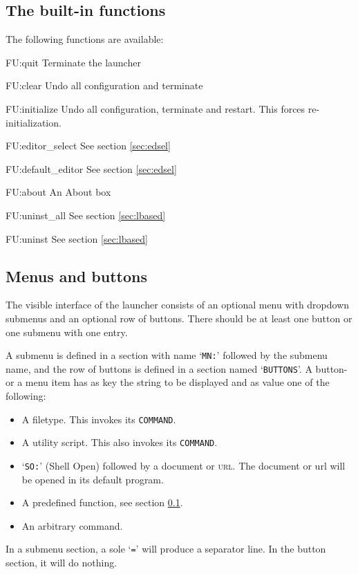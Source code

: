 \documentclass[11pt,a4paper,oneside]{report}
\newenvironment{ttdesc}{%
  \def\descriptionlabel##1{\hspace\labelsep\ttfamily\selectfont ##1}%
  \description}{\enddescription}
\begin{document}
\subsection{The built-in functions}
\label{sec:fun}

The following functions are available:
\begin{ttdesc}
\item [FU:quit] Terminate the launcher
\item [FU:clear] Undo all configuration and terminate
\item [FU:initialize] Undo all configuration, terminate and
  restart. This forces re-initialization.
\item [FU:editor\_select] See section \ref{sec:edsel}
\item [FU:default\_editor] See section \ref{sec:edsel}
\item [FU:about] An About box
\item [FU:uninst\_all] See section \ref{sec:lbased}
\item [FU:uninst] See section \ref{sec:lbased}
\end{ttdesc}

\subsection{Menus and buttons}
\label{sec:controls}

The visible interface of the launcher consists of an optional menu
with dropdown submenus and an optional row of buttons. There should be
at least one button or one submenu with one entry.

A submenu is defined in a section with name `\texttt{MN:}' followed
by the submenu name, and the row of buttons is defined in a section
named `\texttt{BUTTONS}'. A button- or a menu item has as key the
string to be displayed and as value one of the following:
\begin{itemize}
\item A filetype. This invokes its \texttt{COMMAND}.
\item A utility script. This also invokes its \texttt{COMMAND}.
\item `\texttt{SO:}' (Shell Open) followed by a document or
  \textsc{url}. The document or url will be opened in its default
  program.
\item A predefined function, see section \ref{sec:fun}.
\item An arbitrary command.
\end{itemize}
In a submenu section, a sole `\texttt{=}' will produce a separator
line. In the button section, it will do nothing.
\end{document}
